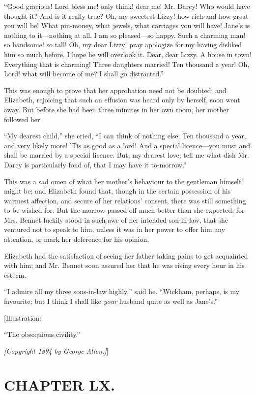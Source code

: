 \documentclass[12pt]{book}
\begin{document}
``Good gracious! Lord bless me! only think! dear me! Mr. Darcy! Who would have thought it? And is it really true? Oh, my sweetest Lizzy! how rich and how great you will be! What pin-money, what jewels, what carriages you will have! Jane's is nothing to it---nothing at all. I am so pleased---so happy. Such a charming man! so handsome! so tall! Oh, my dear Lizzy! pray apologize for my having disliked him so much before. I hope he will overlook it. Dear, dear Lizzy. A house in town! Everything that is charming! Three daughters married! Ten thousand a year! Oh, Lord! what will become of me? I shall go distracted.''

This was enough to prove that her approbation need not be doubted; and Elizabeth, rejoicing that such an effusion was heard only by herself, soon went away. But before she had been three minutes in her own room, her mother followed her.

``My dearest child,'' she cried, ``I can think of nothing else. Ten thousand a year, and very likely more! 'Tis as good as a lord! And a special licence---you must and shall be married by a special licence. But, my dearest love, tell me what dish Mr. Darcy is particularly fond of, that I may have it to-morrow.''

This was a sad omen of what her mother's behaviour to the gentleman himself might be; and Elizabeth found that, though in the certain possession of his warmest affection, and secure of her relations' consent, there was still something to be wished for. But the morrow passed off much better than she expected; for Mrs. Bennet luckily stood in such awe of her intended son-in-law, that she ventured not to speak to him, unless it was in her power to offer him any attention, or mark her deference for his opinion.

Elizabeth had the satisfaction of seeing her father taking pains to get acquainted with him; and Mr. Bennet soon assured her that he was rising every hour in his esteem.

``I admire all my three sons-in-law highly,'' said he. ``Wickham, perhaps, is my favourite; but I think I shall like \textit{your} husband quite as well as Jane's.''

[Illustration:

``The obsequious civility.''

\emph{[\textit{Copyright 1894 by George Allen.}]}]

\chapter{CHAPTER LX.}
\end{document}

